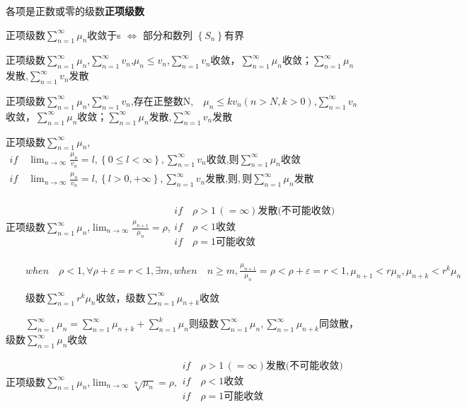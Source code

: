 \documentclass[UTF8]{ctexart}
\newcommand{\mt}[1]{\text{#1}}
\newcommand{\mb}[1]{\textbf{#1}}
\newcommand{\md}[1]{\displaystyle{#1}}
\newcommand{\mda}[1]{$\displaystyle{ #1 }$}
\newcommand{\mf}[1]{\left( #1\right)}
\newcommand{\mfb}[1]{\left\{ #1\right\}}
\newcommand{\q}{\quad}
\newcommand{\ma}[1]{\begin{array}{llll} #1 \end{array}}
\begin{document}
各项是正数或零的级数\mb{正项级数}

正项级数\mda{\sum_{n=1}^\infty\mu_n}收敛于s $\Leftrightarrow$ 部分和数列 $\mfb{S_n}$有界

正项级数\mda{\sum_{n=1}^\infty\mu_n},\mda{\sum_{n=1}^\infty v_n},$\mu_n\leqslant v_n$,\mda{\sum_{n=1}^\infty v_n}收敛，\mda{\sum_{n=1}^\infty\mu_n}收敛；\mda{\sum_{n=1}^\infty\mu_n}发散,\mda{\sum_{n=1}^\infty v_n}发散

正项级数\mda{\sum_{n=1}^\infty\mu_n},\mda{\sum_{n=1}^\infty v_n},存在正整数N,$ \q\mu_n\leqslant kv_n\mf{n> N,k>0}$,\mda{\sum_{n=1}^\infty v_n}收敛，\mda{\sum_{n=1}^\infty\mu_n}收敛；\mda{\sum_{n=1}^\infty\mu_n}发散,\mda{\sum_{n=1}^\infty v_n}发散

正项级数\mda{\sum_{n=1}^\infty\mu_n},\mda{\ma{
    if \q \lim_{n \rightarrow \infty}\frac{\mu_n}{v_n}=l,\mfb{0\leqslant l < \infty}, {\sum_{n=1}^\infty v_n}\mt{收敛,则} {\sum_{n=1}^\infty \mu_n}\mt{收敛}\\
    if \q \lim_{n \rightarrow \infty}\frac{\mu_n}{v_n}=l,\mfb{l>0,+\infty},{\sum_{n=1}^\infty v_n}\mt{发散,则},则{\sum_{n=1}^\infty \mu_n}\mt{发散}\\
}}

正项级数\mda{\sum_{n=1}^\infty\mu_n},\mda{\lim_{n \rightarrow \infty}\frac{\mu_{n+1}}{\mu_n}=\rho},$\ma{
    if \q \rho >1 \,\mf{=\infty} \mt{发散(不可能收敛)}\\
    if \q \rho <1 \mt{收敛}\\
    if \q \rho =1 \mt{可能收敛}\\
}$



$\q \q when  \q \rho <1 ,\forall \rho + \varepsilon=r<1,\exists m,when \q n\geqslant m,\frac{\mu_{n+1}}{\mu_n}=\rho<\rho+\varepsilon=r<1,{\mu_{n+1}}<r{\mu_n},{\mu_{n+k}}<r^k{\mu_n}$

$\q \q  $级数$\sum_{n=1}^\infty r^k\mu_n$收敛，级数$\sum_{n=1}^\infty \mu_{n+k}$收敛

$\q \q \md{\sum _{n=1}^\infty \mu_n =\sum _{n=1}^\infty \mu_{n+k} + \sum _{n=1}^k\mu_n}$则级数$\sum _{n=1}^\infty \mu_n ,\sum _{n=1}^\infty \mu_{n+k}$同敛散，级数$\sum_{n=1}^\infty \mu_{n}$收敛


正项级数\mda{\sum_{n=1}^\infty\mu_n},\mda{\lim_{n \rightarrow \infty}\sqrt[n]{\mu_n}=\rho,\ma{
    if \q \rho >1 \,\mf{=\infty} \mt{发散(不可能收敛)}\\
    if \q \rho <1 \mt{收敛}\\
    if \q \rho =1 \mt{可能收敛}\\
}}
\end{document}
